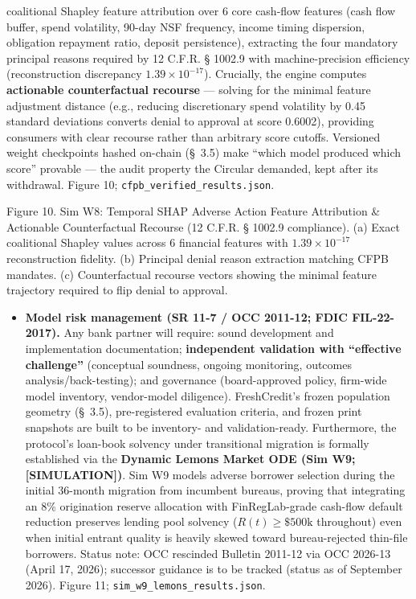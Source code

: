 \documentclass[
]{article}
\providecommand{\tightlist}{%
  \setlength{\itemsep}{0pt}\setlength{\parskip}{0pt}}
\begin{document}
\begin{itemize}
  coalitional Shapley feature attribution over 6 core cash-flow features
  (cash flow buffer, spend volatility, 90-day NSF frequency, income
  timing dispersion, obligation repayment ratio, deposit persistence),
  extracting the four mandatory principal reasons required by 12 C.F.R.
  § 1002.9 with machine-precision efficiency (reconstruction discrepancy
  \(1.39 \times 10^{-17}\)). Crucially, the engine computes
  \textbf{actionable counterfactual recourse} --- solving for the
  minimal feature adjustment distance (e.g., reducing discretionary
  spend volatility by 0.45 standard deviations converts denial to
  approval at score 0.6002), providing consumers with clear recourse
  rather than arbitrary score cutoffs. Versioned weight checkpoints
  hashed on-chain (§~3.5) make ``which model produced which score''
  provable --- the audit property the Circular demanded, kept after its
  withdrawal. Figure 10; \texttt{cfpb\_verified\_results.json}.
\end{itemize}

Figure 10. Sim W8: Temporal SHAP Adverse Action Feature Attribution \&
Actionable Counterfactual Recourse (12 C.F.R. § 1002.9 compliance). (a)
Exact coalitional Shapley values across 6 financial features with
\(1.39 \times 10^{-17}\) reconstruction fidelity. (b) Principal denial
reason extraction matching CFPB mandates. (c) Counterfactual recourse
vectors showing the minimal feature trajectory required to flip denial
to approval.

\begin{itemize}
\tightlist
\item
  \textbf{Model risk management (SR 11-7 / OCC 2011-12; FDIC
  FIL-22-2017).} Any bank partner will require: sound development and
  implementation documentation; \textbf{independent validation with
  ``effective challenge''} (conceptual soundness, ongoing monitoring,
  outcomes analysis/back-testing); and governance (board-approved
  policy, firm-wide model inventory, vendor-model diligence).
  FreshCredit's frozen population geometry (§~3.5), pre-registered
  evaluation criteria, and frozen print snapshots are built to be
  inventory- and validation-ready. Furthermore, the protocol's loan-book
  solvency under transitional migration is formally established via the
  \textbf{Dynamic Lemons Market ODE (Sim W9; {[}SIMULATION{]})}. Sim W9
  models adverse borrower selection during the initial 36-month
  migration from incumbent bureaus, proving that integrating an 8\%
  origination reserve allocation with FinRegLab-grade cash-flow default
  reduction preserves lending pool solvency (\(R(t) \ge \$500\text{k}\)
  throughout) even when initial entrant quality is heavily skewed toward
  bureau-rejected thin-file borrowers. Status note: OCC rescinded
  Bulletin 2011-12 via OCC 2026-13 (April 17, 2026); successor guidance
  is to be tracked (status as of September 2026). Figure 11;
  \texttt{sim\_w9\_lemons\_results.json}.
\end{itemize}
\end{document}
